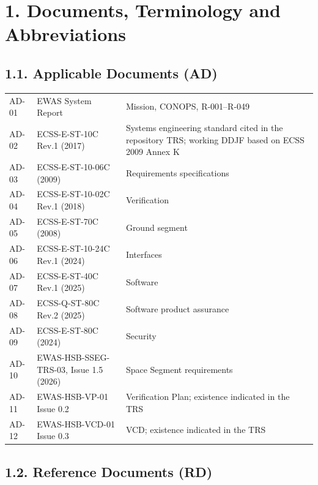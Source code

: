 \section{1. Documents, Terminology and Abbreviations}\label{references-terminology-and-abbreviations}

\subsection{1.1. Applicable Documents (AD)}\label{applicable-documents-ad}

\begingroup{}
\begin{longtable}{|P{0.12}|P{0.45}|P{0.43}|}
\hline{}
 &  & \\ \hline
\endhead
\hline\endlastfoot
AD-01 & EWAS System Report & Mission, CONOPS, R-001–R-049\\ \hline
AD-02 & ECSS-E-ST-10C Rev.1 (2017) & Systems engineering standard cited in the repository TRS; working DDJF based on ECSS 2009 Annex K\\ \hline
AD-03 & ECSS-E-ST-10-06C (2009) & Requirements specifications\\ \hline
AD-04 & ECSS-E-ST-10-02C Rev.1 (2018) & Verification\\ \hline
AD-05 & ECSS-E-ST-70C (2008) & Ground segment\\ \hline
AD-06 & ECSS-E-ST-10-24C Rev.1 (2024) & Interfaces\\ \hline
AD-07 & ECSS-E-ST-40C Rev.1 (2025) & Software\\ \hline
AD-08 & ECSS-Q-ST-80C Rev.2 (2025) & Software product assurance\\ \hline
AD-09 & ECSS-E-ST-80C (2024) & Security\\ \hline
AD-10 & EWAS-HSB-SSEG-TRS-03, Issue 1.5 (2026) & Space Segment requirements\\ \hline
AD-11 & EWAS-HSB-VP-01 Issue 0.2 & Verification Plan; existence indicated in the TRS\\ \hline
AD-12 & EWAS-HSB-VCD-01 Issue 0.3 & VCD; existence indicated in the TRS\\*
\end{longtable}
\endgroup

\subsection{1.2. Reference Documents (RD)}\label{reference-documents-rd}

